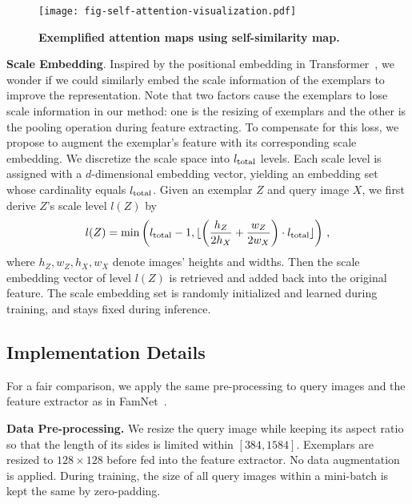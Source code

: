 \documentclass[10pt,twocolumn,letterpaper]{article}
\newcommand{\margin}{\vspace{3pt}\noindent}
\begin{document}
\begin{figure}[t]
  \centering
   \texttt{[image: fig-self-attention-visualization.pdf]}\vspace{-5pt}
   \caption{\textbf{Exemplified attention maps using self-similarity map.}}
   \label{fig:self-attention-visualization}
   \vspace{-5pt}
\end{figure}

\margin
\textbf{Scale Embedding}. 
Inspired by the positional embedding in Transformer~\cite{transformer}, we wonder if we could similarly embed the scale information of the exemplars to improve the representation. Note that two factors cause the exemplars to lose scale information in our method: one is the resizing of exemplars and the other is the pooling operation during feature extracting. 
To compensate for this loss, we propose to augment the exemplar's feature with its corresponding scale embedding. We discretize the scale space into $l_{\rm total}$ levels. Each scale level is assigned with a $d$-dimensional embedding vector, yielding an embedding set whose cardinality equals $l_{\rm total}$. Given an exemplar $Z$ and query image $X$, we first derive $Z$'s scale level $l(Z)$ by
\begin{equation}\label{equation:level}
    l(Z)=\min \left( l_{\rm total}-1, \lfloor \left( \frac{h_Z}{2h_X}+\frac{w_Z}{2w_X} \right) \cdot l_{\rm total} \rfloor \right)\,,
\end{equation}
where $h_Z, w_Z, h_X, w_X$ denote images' heights and widths. Then the scale embedding vector of level $l(Z)$ is retrieved and added back into the original feature. The scale embedding set is randomly initialized and learned during training, and stays fixed during inference. 





\subsection{Implementation Details}
For a fair comparison, we apply the same pre-processing to query images and the feature extractor as in FamNet~\cite{famnet}.

\margin
\textbf{Data Pre-processing.}
We resize the query image while keeping its aspect ratio so that the length of its sides is limited within $[384, 1584]$. Exemplars are resized to $128\times 128$ before fed into the feature extractor. No data augmentation is applied. During training, the size of all query images within a mini-batch is kept the same by zero-padding. 
\end{document}
